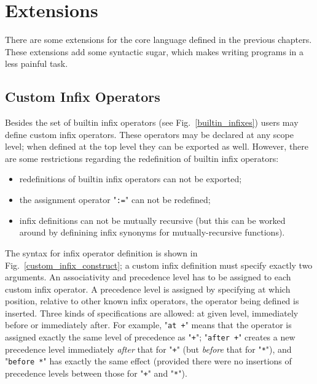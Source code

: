 \chapter{Extensions}
\label{sec:extensions}

There are some extensions for the core language defined in the previous chapters. These
extensions add some syntactic sugar, which makes writing programs in \lama a less
painful task.

\section{Custom Infix Operators}
\label{sec:custom_infix}

Besides the set of builtin infix operators (see Fig.~\ref{builtin_infixes}) users may define
custom infix operators. These operators may be declared at any scope level; when defined
at the top level they can be exported as well. However, there are some restrictions regarding the
redefinition of builtin infix operators:

\begin{itemize}
\item redefinitions of builtin infix operators can not be exported;
\item the assignment operator "\lstinline|:=|" can not be redefined;
\item infix definitions can not be mutually recursive (but this can be worked around by
  definining infix synonyms for mutually-recursive functions).
\end{itemize}

The syntax for infix operator definition is shown in Fig.~\ref{custom_infix_construct}; a custom infix definition must specify exactly two arguments.
An associativity and precedence level has to be assigned to each custom infix operator. A precedence level is assigned by specifying at which
position, relative to other known infix operators, the operator being defined is inserted. Three kinds of specifications are allowed: at given level,
immediately before or immediately after. For example, "\lstinline|at +|" means that the operator is assigned exactly the same
level of precedence as "\lstinline|+|"; "\lstinline|after +|" creates a new precedence level immediately \emph{after} that for
"\lstinline|+|" (but \emph{before} that for "\lstinline|*|"), and "\lstinline|before *|" has exactly the same effect (provided
there were no insertions of precedence levels between those for "\lstinline|+|" and "\lstinline|*|").

